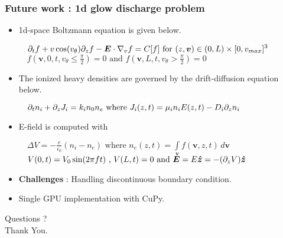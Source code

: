 \documentclass[mathserif, aspectratio=169]{beamer}
\newcommand{\vect}[1]{\boldsymbol{#1}}
\newcommand{\of}[1]{\mleft( #1 \mright)}
\newcommand{\myint}{\int\limits}
\newcommand{\diff}[1]{\, d#1}
\newcommand{\vtheta}{v_{\theta}}
\begin{document}
\begin{frame}
	\frametitle{Future work : 1d glow discharge problem}
	\begin{itemize}
		\item 1d-space Boltzmann equation is given below. 
		\begin{center}
			$
			\displaystyle
			\quad
			\partial_t f + v\cos\of{\vtheta} \partial_z f -\vect{E}\cdot\nabla_v f = C[f] \text{ for } (z,\vect{v}) \in (0,L) \times[0,v_{max}]^3 $ \\
			
			$
			\displaystyle
			\quad
			f(\vect{v}, 0, t, \vtheta \leq \frac{\pi}{2})	= 0 \text{ and } f(\vect{v}, L, t, \vtheta > \frac{\pi}{2})	= 0$
		\end{center}
		\item The ionized heavy densities are governed by the drift-diffusion equation below.
		\begin{center}
			$
			\displaystyle
			\quad
			\partial_t n_i + \partial_z J_i = k_i n_0 n_e \text{ where } J_i\of{z, t} = \mu_i n_i E\of{z,t} -D_i \partial_z n_i$
		\end{center}
		\item E-field is computed with 
		\begin{center}
			$
			\displaystyle
			\quad
			\Delta V = -\frac{e}{\epsilon_0} (n_i-n_e) \text{ where } n_e(z,t) = \myint_{\vect{v}} f(\vect{v}, z, t) \diff{\vect{v}}$ \\
			$
			\displaystyle
			\quad
			V(0,t) = V_0 \sin(2\pi ft) \text{ , } V(L,t) = 0 \text{ and } \vect{E} = E \vect{\hat{z}} = -\of{\partial_z V} \vect{\hat{z}}$
		\end{center}
	\item \textbf{Challenges} : Handling discontinuous boundary condition. 
	\item Single GPU implementation with CuPy. 
	\end{itemize}
\end{frame}

\begin{frame}
	\centering
	\Huge Questions ? \\
	\centering
	\Huge Thank You. 
\end{frame}
\end{document}
